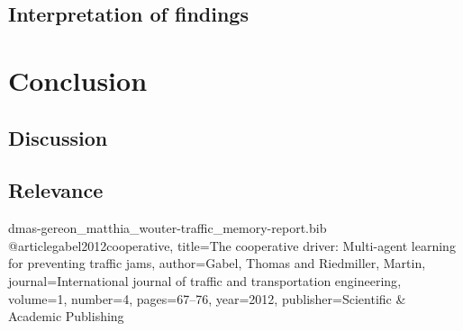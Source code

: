 \documentclass[a4paper,hidelinks]{article}
\begin{document}
\subsection{Interpretation of findings}


\section{Conclusion}
\subsection{Discussion}
\subsection{Relevance}





\begin{filecontents}{dmas-gereon_matthia_wouter-traffic_memory-report.bib}
@article{gabel2012cooperative,
  title={The cooperative driver: Multi-agent learning for preventing traffic jams},
  author={Gabel, Thomas and Riedmiller, Martin},
  journal={International journal of traffic and transportation engineering},
  volume={1},
  number={4},
  pages={67--76},
  year={2012},
  publisher={Scientific \& Academic Publishing}
}
\end{filecontents}
\end{document}
